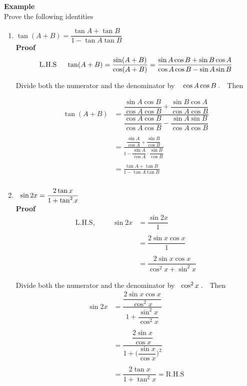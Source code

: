\documentclass[11pt,a4paper]{article}
\begin{document}
\pagebreak
\textbf{Example}\\
Prove the following identities
\begin{enumerate}
\item $\displaystyle{\tan (A+B) = \dfrac{\tan A + \tan B}{1 - \tan A\tan B}}$\\

\textbf{Proof}
$$\text{L.H.S}\hspace{0.5cm}\tan (A + B) = \dfrac{\sin (A+ B)}{\cos (A + B)} = \dfrac{\sin A\cos B + \sin B \cos A}{\cos A \cos B - \sin A \sin B}$$

Divide both the numerator and the denominator by $\hspace{0.3cm} \cos A \cos B\hspace{0.1cm}.\hspace{0.2cm}$ Then

\begin{align*}
\tan (A + B) & = \dfrac{\dfrac{\sin A \cos B}{\cos A\cos B} + \dfrac{\sin B\cos A}{\cos A\cos B}}{\dfrac{\cos A \cos B}{\cos A\cos B} - \dfrac{\sin A\sin B}{\cos A\cos B}}\\\\
& = \frac{\dfrac{\sin A}{\cos A} + \dfrac{\sin B}{\cos B}}{1 - \dfrac{\sin A}{\cos A}\cdot\dfrac{\sin B}{\cos B}}\\\\
& = \frac{\tan A + \tan B}{1 - \tan A \tan B}\\\\
\end{align*}




\item $\hspace{0.2cm}\displaystyle{\sin 2 x  = \dfrac{2\tan x}{1 + \tan^2 x}}$\\

\textbf{Proof}
\begin{align*}
\text{L.H.S},\hspace{1cm} \sin 2 x & = \dfrac{\sin 2x}{1}\\\\
& = \dfrac{2\sin x \cos x}{1}\\\\
& = \dfrac{2\sin x \cos x}{\cos^2x + \sin^2x}
\end{align*}

Divide both the numerator and the denominator by $\hspace{0.2cm} \cos^2x\hspace{0.1cm}.\hspace{0.2cm}$ Then 
\begin{align*}
\sin 2x & = \dfrac{\dfrac{2\sin x \cos x}{\cos^2x}}{1 + \dfrac{\sin^2x}{\cos^2x}}\\\\
& = \dfrac{\dfrac{2\sin x}{\cos x}}{1 + \Big(\dfrac{\sin x}{\cos x}\Big)^2}\\\\
& = \dfrac{2\tan x }{1 + \tan^2x} = \text{R.H.S}\\\\
\end{align*}
\end{enumerate}
\end{document}
